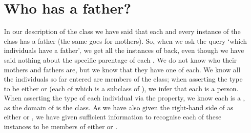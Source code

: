 %
%
%
\section{Who has a father?}

In our description of the \person class we have said that each and every instance of the class \person has a father (the same goes for mothers). So, when we ask the query `which individuals have a father', we get all the instances of \person back, even though we have said nothing about the specific parentage of each \person. We do not know who their mothers and fathers are, but we know that they have one of each. We know all the individuals so far entered are members of the \person class;  when  asserting the type to be either \man or \woman (each of which is a subclass of \person), we infer that each is a person. When asserting the type of each individual via the  property, we know each is a \person, as the domain of  is the \person class. As we have also given the right-hand side of  as either \male  or \female, we have given sufficient information to recognise each of these \person instances to be members of either \man or \woman.

